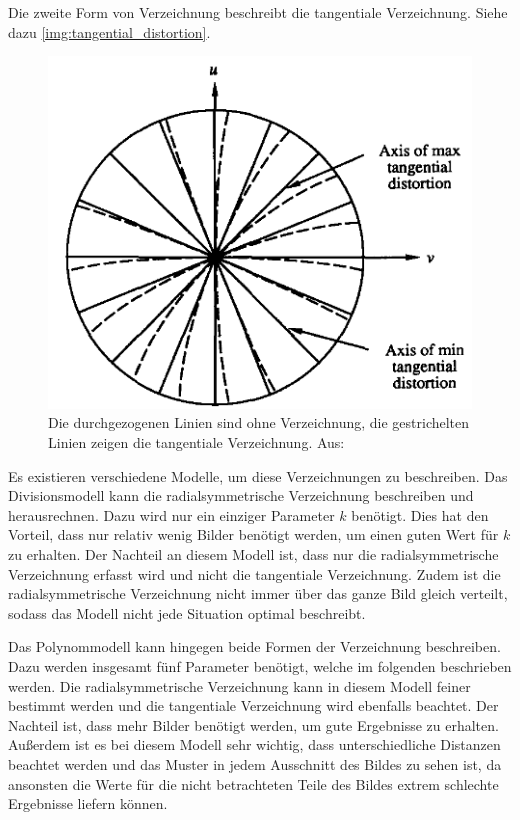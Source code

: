 Die zweite Form von Verzeichnung beschreibt die tangentiale Verzeichnung. Siehe dazu \autoref{img:tangential_distortion}.
\begin{figure}[!hbt]
	\centering
	\vspace{1ex}
	\includegraphics[scale=0.5]{../images/tangential_distortion}
	\caption[Die durchgezogenen Linien sind ohne Verzeichnung, die gestrichelten Linien zeigen die tangentiale Verzeichnung. Aus: \cite{tangential_distortion}]{\label{img:tangential_distortion}Die durchgezogenen Linien sind ohne Verzeichnung, die gestrichelten Linien zeigen die tangentiale Verzeichnung. Aus: \cite{tangential_distortion}}
	\vspace{1ex}
\end{figure}

Es existieren verschiedene Modelle, um diese Verzeichnungen zu beschreiben. Das Divisionsmodell kann die radialsymmetrische Verzeichnung beschreiben und herausrechnen. Dazu wird nur ein einziger Parameter $k$ benötigt. Dies hat den Vorteil, dass nur relativ wenig Bilder benötigt werden, um einen guten Wert für $k$ zu erhalten. Der Nachteil an diesem Modell ist, dass nur die radialsymmetrische Verzeichnung erfasst wird und nicht die tangentiale Verzeichnung. Zudem ist die radialsymmetrische Verzeichnung nicht immer über das ganze Bild gleich verteilt, sodass das Modell nicht jede Situation optimal beschreibt.

Das Polynommodell kann hingegen beide Formen der Verzeichnung beschreiben. Dazu werden insgesamt fünf Parameter benötigt, welche im folgenden beschrieben werden. Die radialsymmetrische Verzeichnung kann in diesem Modell feiner bestimmt werden und die tangentiale Verzeichnung wird ebenfalls beachtet. Der Nachteil ist, dass mehr Bilder benötigt werden, um gute Ergebnisse zu erhalten. Außerdem ist es bei diesem Modell sehr wichtig, dass unterschiedliche Distanzen beachtet werden und das Muster in jedem Ausschnitt des Bildes zu sehen ist, da ansonsten die Werte für die nicht betrachteten Teile des Bildes extrem schlechte Ergebnisse liefern können.

